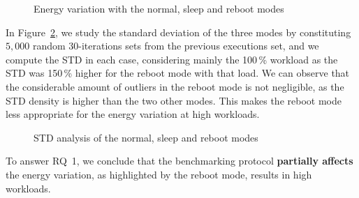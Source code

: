 \begin{figure}
    \caption{Energy variation with the \textsf{normal}, \textsf{sleep} and \textsf{reboot} modes}\label{fig:running-process}
\end{figure}

In Figure~\ref{fig:reboot}, we study the standard deviation of the three modes by constituting $5,000$ random 30-iterations sets from the previous executions set, and we compute the STD in each case, considering mainly the 100\,\% workload as the STD was 150\,\% higher for the \textsf{reboot} mode with that load.
We can observe that the considerable amount of outliers in the \textsf{reboot} mode is not negligible, as the STD density is higher than the two other modes.
This makes the \textsf{reboot} mode less appropriate for the energy variation at high workloads.

\begin{figure}
    \caption{STD analysis of the \textsf{normal}, \textsf{sleep} and \textsf{reboot} modes}\label{fig:reboot}
\end{figure}

\begin{mdframed}[skipabove=\topsep,skipbelow=\topsep]

    To answer \textsc{RQ~1}, we conclude that the benchmarking protocol \textbf{partially affects} the energy variation, as highlighted by the \textsf{reboot} mode, results in high workloads.

\end{mdframed}


